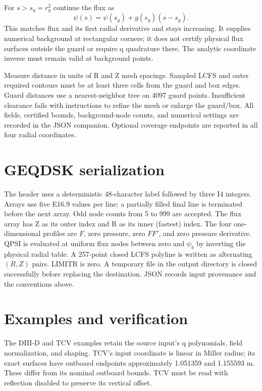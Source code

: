 \documentclass[11pt]{article}
\begin{document}
For $s>s_g=r_g^2$ continue the flux as
\begin{equation}
\psi(s)=\psi(s_g)+g(s_g)(s-s_g).
\end{equation}
This matches flux and its first radial derivative and stays increasing.
It supplies numerical background at rectangular corners; it does not certify
physical flux surfaces outside the guard or require q quadrature there.
The analytic coordinate inverse must remain valid at background points.

Measure distance in units of R and Z mesh spacings. Sampled LCFS and outer
required contours must be at least three cells from the guard and box edges.
Guard distances use a nearest-neighbor tree on 4097 guard points. Insufficient
clearance fails with instructions to refine the mesh or enlarge the guard/box.
All fields, certified bounds, background-node counts, and numerical settings
are recorded in the JSON companion. Optional coverage endpoints are reported
in all four radial coordinates.

\section{GEQDSK serialization}
The header uses a deterministic 48-character label followed by three I4
integers. Arrays use five E16.9 values per line; a partially filled final line
is terminated before the next array. Odd node counts from 5 to 999 are accepted.
The flux array has Z as its outer index and R as its inner (fastest) index.
The four one-dimensional profiles are $F$, zero pressure, zero $FF'$, and
zero pressure derivative. QPSI is evaluated at uniform flux nodes between zero
and $\psi_b$ by inverting the physical radial table. A 257-point closed LCFS
polyline is written as alternating $(R,Z)$ pairs. LIMITR is zero. A temporary
file in the output directory is closed successfully before replacing the
destination. JSON records input provenance and the conventions above.

\section{Examples and verification}
The DIII-D and TCV examples retain the source input's q polynomials, field
normalization, and shaping. TCV's input coordinate is linear in Miller radius;
its exact surfaces have outboard endpoints approximately 1.051359 and
1.155593 m. These differ from its nominal outboard bounds. TCV must be read
with reflection disabled to preserve its vertical offset.
\end{document}
